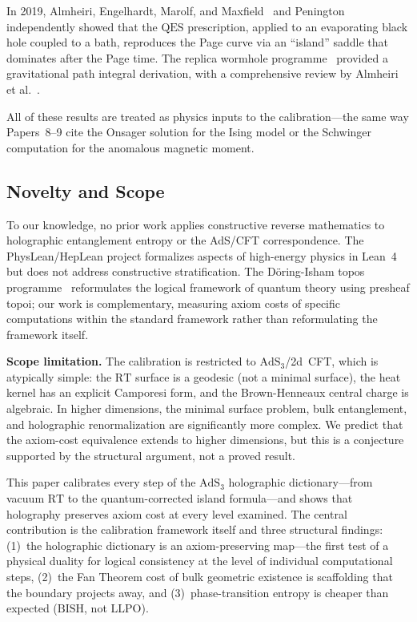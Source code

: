 \documentclass[11pt,a4paper]{article}
\theoremstyle{plain}
\theoremstyle{definition}
\newcommand{\LLPO}{\ensuremath{\mathrm{LLPO}}}
\newcommand{\BISH}{\ensuremath{\mathrm{BISH}}}
\newcommand{\AdS}{\ensuremath{\mathrm{AdS}}}
\newcommand{\RT}{\ensuremath{\mathrm{RT}}}
\newcommand{\QES}{\ensuremath{\mathrm{QES}}}
\begin{document}
In 2019, Almheiri, Engelhardt, Marolf, and
Maxfield~\cite{AEMM2019} and Penington~\cite{Penington2019}
independently showed that the $\QES$ prescription, applied to an
evaporating black hole coupled to a bath, reproduces the Page
curve via an ``island'' saddle that dominates after the Page time.
The replica wormhole programme~\cite{AHMST2020,PSSY2022} provided
a gravitational path integral derivation, with a comprehensive
review by Almheiri et al.~\cite{AHMST2021RMP}.

All of these results are treated as physics inputs to the
calibration---the same way Papers~8--9 cite the Onsager solution
for the Ising model or the Schwinger computation for the anomalous
magnetic moment.

\subsection{Novelty and Scope}\label{sec:novelty}

To our knowledge, no prior work applies constructive reverse
mathematics to holographic entanglement entropy or the AdS/CFT
correspondence.  The PhysLean/HepLean project formalizes aspects
of high-energy physics in Lean~4 but does not address constructive
stratification.  The D\"oring-Isham topos programme~\cite{DoringIsham2008}
reformulates the logical framework of quantum theory using presheaf
topoi; our work is complementary, measuring axiom costs of specific
computations within the standard framework rather than reformulating
the framework itself.

\textbf{Scope limitation.}
The calibration is restricted to $\AdS_3$/2d~CFT, which is
atypically simple: the $\RT$ surface is a geodesic (not a minimal
surface), the heat kernel has an explicit Camporesi form, and the
Brown-Henneaux central charge is algebraic.  In higher dimensions,
the minimal surface problem, bulk entanglement, and holographic
renormalization are significantly more complex.
We predict that the axiom-cost equivalence extends to higher
dimensions, but this is a conjecture supported by the structural
argument, not a proved result.

This paper calibrates every step of the $\AdS_3$ holographic dictionary---from
vacuum $\RT$ to the quantum-corrected island formula---and shows that
holography preserves axiom cost at every level examined.  The central
contribution is the calibration framework itself and three structural
findings: (1)~the holographic dictionary is an axiom-preserving
map---the first test of a physical duality for logical consistency
at the level of individual computational steps,
(2)~the Fan Theorem cost of bulk geometric existence is scaffolding
that the boundary projects away, and (3)~phase-transition entropy is
cheaper than expected ($\BISH$, not $\LLPO$).
\end{document}
